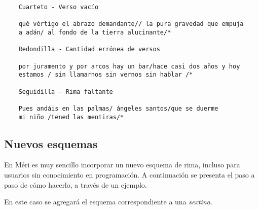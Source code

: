 \documentclass[12pt, a4paper]{article}
\begin{document}
\begin{verbatim}
    Cuarteto - Verso vacío
    
    qué vértigo el abrazo demandante// la pura gravedad que empuja
    a adán/ al fondo de la tierra alucinante/*
    
    Redondilla - Cantidad errónea de versos
    
    por juramento y por arcos hay un bar/hace casi dos años y hoy 
    estamos / sin llamarnos sin vernos sin hablar /* 
    
    Seguidilla - Rima faltante
    
    Pues andáis en las palmas/ ángeles santos/que se duerme 
    mi niño /tened las mentiras/*
\end{verbatim}
\subsection*{Nuevos esquemas}
En Méri es muy sencillo incorporar un nuevo esquema de rima, incluso para usuarios sin conocimiento en programación. A continuación se presenta el paso a paso de cómo hacerlo, a través de un ejemplo.

\medskip
En este caso se agregará el esquema correspondiente a una \textit{sextina}.
\end{document}
